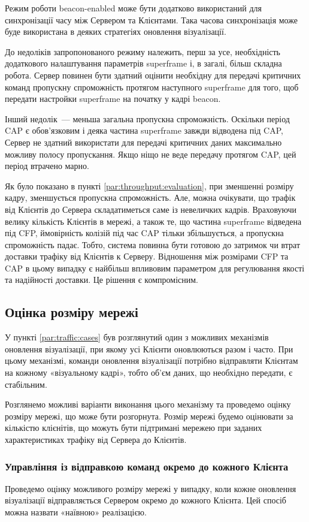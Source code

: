 \documentclass[a4paper,ukrainian,utf8,nocolumnsxix,floatsection,equationsection]{eskdtext}
\renewcommand\paragraph{\subsubsection}
\newcommand{\bem}[0]{beacon-enabled\xspace}
\begin{document}
Режим роботи \bem може бути додатково використаний для синхронізації часу між Сервером та Клієнтами. Така часова синхронізація може буде використана в деяких стратегіях оновлення візуалізації.

До недоліків запропонованого режиму належить, перш за усе, необхідність додаткового налаштування параметрів superframe і, в загалі, більш складна робота. Сервер повинен бути здатний оцінити необхідну для передачі критичних команд пропускну спроможність протягом наступного superframe для того, щоб передати настройки superframe на початку у кадрі beacon.

Інший недолік~--- меньша загальна пропускна спроможність. Оскільки період CAP є обов’язковим і деяка частина superframe завжди відводена під CAP, Сервер не здатний використати для передачі критичних даних максимально можливу полосу пропускання. Якщо ніщо не веде передачу протягом CAP, цей період втрачено марно.

Як було показано в пункті \ref{par:throughput:evaluation}, при зменшенні розміру кадру, зменшується пропускна спроможність. Але, можна очікувати, що трафік від Клієнтів до Сервера складатиметься саме із невеличких кадрів. Враховуючи велику кількість Клієнтів в мережі, а також те, що частина superframe відведена під CFP, ймовірність колізій під час CAP тільки збільшується, а пропускна спроможність падає. Тобто, система повинна бути готовою до затримок чи втрат доставки трафіку від Клієнтів к Серверу. Відношення між розмірами CFP та CAP в цьому випадку є найбільш впливовим параметром для регулювання якості та надійності доставки. Це рішення є компромісним.

\subsection{Оцінка розміру мережі}

У пункті \ref{par:traffic:cases} був розглянутий один з можливих механізмів оновлення візуалізації, при якому усі Клієнти оновлюються разом і часто. При цьому механізмі, команди оновлення візуалізації потрібно відправляти Клієнтам на кожному «візуальному кадрі», тобто об’єм даних, що необхідно передати, є стабільним. 

Розглянемо можливі варіанти виконання цього механізму та проведемо оцінку розміру мережі, що може бути розгорнута. Розмір мережі будемо оцінювати за кількістю клієнітів, що можуть бути підтримані мережею при заданих характеристиках трафіку від Сервера до Клієнтів.

\paragraph{Управління із відправкою команд окремо до кожного Клієнта}
\label{par:individual:send}
Проведемо оцінку можливого розміру мережі у випадку, коли кожне оновлення візуалізації відправляється Сервером окремо до кожного Клієнта. Цей спосіб можна назвати «наївною» реалізацією.
\end{document}
